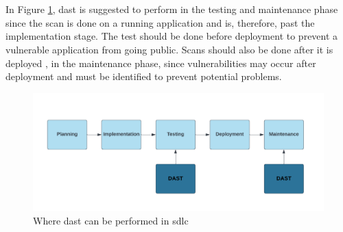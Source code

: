 \\~\\
In Figure \ref{fig: Where DAST can be performed in SDLC}, \acrshort{dast} is suggested to perform in the testing and maintenance phase since the scan is done on a running application and is, therefore, past the implementation stage. The test should be done before deployment to prevent a vulnerable application from going public. Scans should also be done after it is deployed \cite{dastplacment}, in the maintenance phase, since vulnerabilities may occur after deployment and must be identified to prevent potential problems.

\vspace{2mm}
\begin{figure}[H]
    \centering
    \includegraphics[width=0.8\columnwidth]{Images/dast.png}
    \caption{Where \acrshort{dast} can be performed in \acrshort{sdlc}} 
    \label{fig: Where DAST can be performed in SDLC}
\end{figure}

